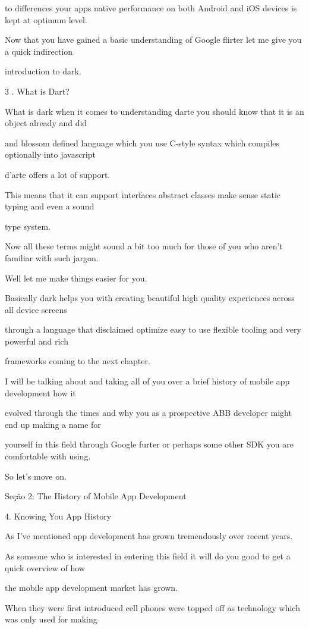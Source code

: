 to differences your apps native performance on both Android and iOS devices is kept at optimum level.

Now that you have gained a basic understanding of Google flirter let me give you a quick indirection

introduction to dark.


3 . What is Dart?

What is dark when it comes to understanding darte you should know that it is an object already and did

and blossom defined language which you use C-style syntax which compiles optionally into javascript

d'arte offers a lot of support.

This means that it can support interfaces abstract classes make sense static typing and even a sound

type system.

Now all these terms might sound a bit too much for those of you who aren't familiar with such jargon.

Well let me make things easier for you.

Basically dark helps you with creating beautiful high quality experiences across all device screens

through a language that disclaimed optimize easy to use flexible tooling and very powerful and rich

frameworks coming to the next chapter.

I will be talking about and taking all of you over a brief history of mobile app development how it

evolved through the times and why you as a prospective ABB developer might end up making a name for

yourself in this field through Google furter or perhaps some other SDK you are comfortable with using.

So let's move on.


Seção 2: The History of Mobile App Development

4. Knowing You App History

As I've mentioned app development has grown tremendously over recent years.

As someone who is interested in entering this field it will do you good to get a quick overview of how

the mobile app development market has grown.

When they were first introduced cell phones were topped off as technology which was only used for making

